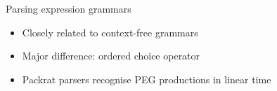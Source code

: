 \documentclass[aspectratio=169]{beamer}
\begin{document}

\begin{frame}{Parsing expression grammars}
	\begin{itemize}
		\item Closely related to context-free grammars \pause
		\item Major difference: \alert{ordered choice} operator \pause
		\item Packrat parsers recognise PEG productions in linear time
	\end{itemize}
\end{frame}
\end{document}

